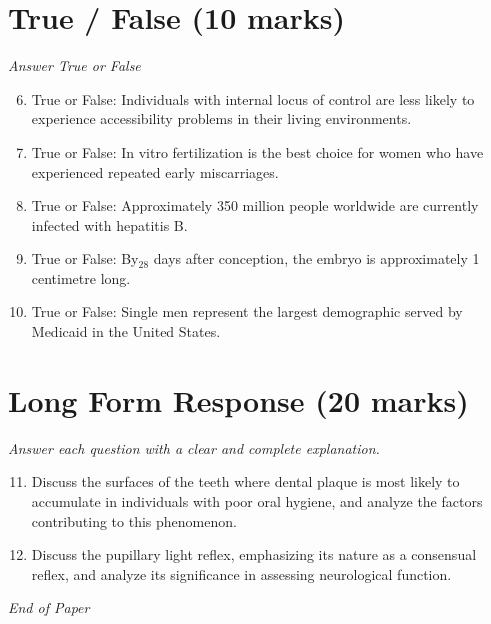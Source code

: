 \documentclass[12pt]{article}
\begin{document}
\section*{True / False (10 marks)}
\textit{Answer True or False}
\begin{enumerate}[label=\arabic*.]
\setcounter{enumi}{5}
\item True or False: Individuals with internal locus of control are less likely to experience accessibility problems in their living environments.
\item True or False: In vitro fertilization is the best choice for women who have experienced repeated early miscarriages.
\item True or False: Approximately 350 million people worldwide are currently infected with hepatitis B.
\item True or False: By$_{28}$ days after conception, the embryo is approximately 1 centimetre long.
\item True or False: Single men represent the largest demographic served by Medicaid in the United States.
\end{enumerate}

\section*{Long Form Response (20 marks)}
\textit{Answer each question with a clear and complete explanation.}
\begin{enumerate}[label=\arabic*.]
\setcounter{enumi}{10}
\item Discuss the surfaces of the teeth where dental plaque is most likely to accumulate in individuals with poor oral hygiene, and analyze the factors contributing to this phenomenon.
\item Discuss the pupillary light reflex, emphasizing its nature as a consensual reflex, and analyze its significance in assessing neurological function.
\end{enumerate}

\vfill
\noindent\textit{End of Paper}
\end{document}
